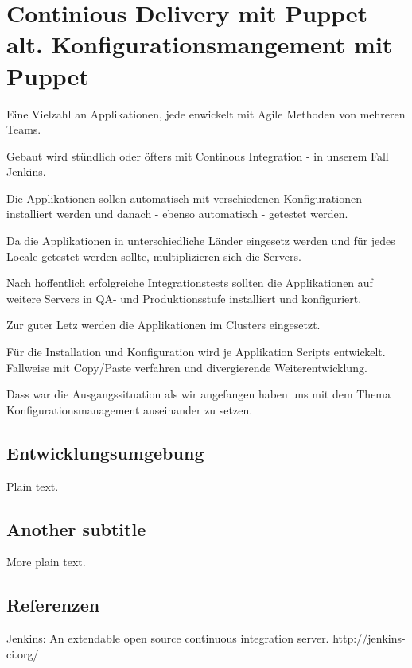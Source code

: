 \documentclass{article}
\begin{document}
\section{Continious Delivery mit Puppet alt. Konfigurationsmangement mit Puppet}

Eine Vielzahl an Applikationen, jede enwickelt mit Agile Methoden von mehreren Teams.

Gebaut wird stündlich oder öfters mit Continous Integration - in unserem Fall Jenkins\cite{Jenkins}.

Die Applikationen sollen automatisch mit verschiedenen Konfigurationen installiert werden und danach - ebenso automatisch - getestet werden.

Da die Applikationen in unterschiedliche Länder eingesetz werden und für jedes Locale getestet werden sollte, multiplizieren sich die Servers.

Nach hoffentlich erfolgreiche Integrationstests sollten die Applikationen auf weitere Servers in QA- und Produktionsstufe installiert und konfiguriert.

Zur guter Letz werden die Applikationen im Clusters eingesetzt.

Für die Installation und Konfiguration wird je Applikation Scripts entwickelt. Fallweise mit Copy/Paste verfahren und divergierende Weiterentwicklung.

Dass war die Ausgangssituation als wir angefangen haben uns mit dem Thema Konfigurationsmanagement auseinander zu setzen.  

\subsection{Entwicklungsumgebung}

Plain text.

\subsection{Another subtitle}

More plain text.

\subsection{Referenzen}

\begin{thebibliography}{9}

  Jenkins: An extendable open source continuous integration server.
  http://jenkins-ci.org/
  
\end{thebibliography}
\end{document}
